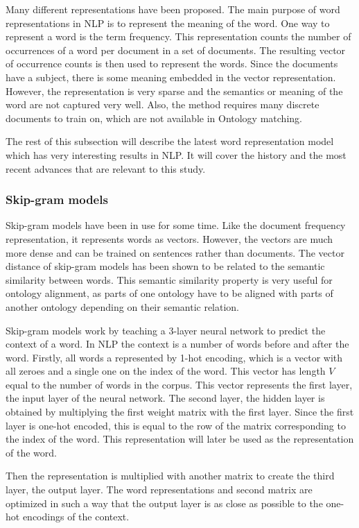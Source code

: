 \documentclass{article}
\begin{document}
 Many different representations have been proposed. The main purpose of word representations in NLP is to represent the meaning of the word. One way to represent a word is the term frequency. This representation counts the number of occurrences of a word per document in a set of documents. The resulting vector of occurrence counts is then used to represent the words. Since the documents have a subject, there is some meaning embedded in the vector representation. However, the representation is very sparse and the semantics or meaning of the word are not captured very well. Also, the method requires many discrete documents to train on, which are not available in Ontology matching.
 
 The rest of this subsection will describe the latest word representation model which has very interesting results in NLP. It will cover the history and the most recent advances that are relevant to this study.
 
 \subsubsection{Skip-gram models}
 Skip-gram models have been in use for some time. Like the document frequency representation, it represents words as vectors. However, the vectors are much more dense and can be trained on sentences rather than documents. The vector distance of skip-gram models has been shown to be related to the semantic similarity between words. This semantic similarity property is very useful for ontology alignment, as parts of one ontology have to be aligned with parts of another ontology depending on their semantic relation.
 
 Skip-gram models work by teaching a 3-layer neural network to predict the context of a word. In NLP the context is a number of words before and after the word. Firstly, all words a represented by 1-hot encoding, which is a vector with all zeroes and a single one on the index of the word. This vector has length $V$ equal to the number of words in the corpus. This vector represents the first layer, the input layer of the neural network. The second layer, the hidden layer is obtained by multiplying the first weight matrix with the first layer. Since the first layer is one-hot encoded, this is equal to the row of the matrix corresponding to the index of the word. This representation will later be used as the representation of the word.
 
 Then the representation is multiplied with another matrix to create the third layer, the output layer. The word representations and second matrix are optimized in such a way that the output layer is as close as possible to the one-hot encodings of the context.
 
\end{document}
